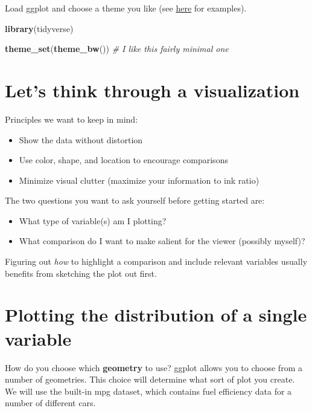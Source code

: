 \documentclass[12pt,]{book}
\newenvironment{Shaded}{\begin{snugshade}}{\end{snugshade}}
\newcommand{\CommentTok}[1]{\textcolor[rgb]{0.56,0.35,0.01}{\textit{#1}}}
\newcommand{\KeywordTok}[1]{\textcolor[rgb]{0.13,0.29,0.53}{\textbf{#1}}}
\newcommand{\NormalTok}[1]{#1}
\providecommand{\tightlist}{%
  \setlength{\itemsep}{0pt}\setlength{\parskip}{0pt}}
\begin{document}
Load ggplot and choose a theme you like (see \href{https://bookdown.org/asmundhreinn/r4ds-master/graphics-for-communication.html\#themes}{here} for examples).

\begin{Shaded}
\begin{Highlighting}[]
\KeywordTok{library}\NormalTok{(tidyverse)}

\KeywordTok{theme_set}\NormalTok{(}\KeywordTok{theme_bw}\NormalTok{()) }\CommentTok{# I like this fairly minimal one}
\end{Highlighting}
\end{Shaded}

\hypertarget{lets-think-through-a-visualization}{%
\section{Let's think through a visualization}\label{lets-think-through-a-visualization}}

Principles we want to keep in mind:

\begin{itemize}
\tightlist
\item
  Show the data without distortion
\item
  Use color, shape, and location to encourage comparisons
\item
  Minimize visual clutter (maximize your information to ink ratio)
\end{itemize}

The two questions you want to ask yourself before getting started are:

\begin{itemize}
\tightlist
\item
  What type of variable(s) am I plotting?
\item
  What comparison do I want to make salient for the viewer (possibly myself)?
\end{itemize}

Figuring out \emph{how} to highlight a comparison and include relevant variables usually benefits from sketching the plot out first.

\hypertarget{plotting-the-distribution-of-a-single-variable}{%
\section{Plotting the distribution of a single variable}\label{plotting-the-distribution-of-a-single-variable}}

How do you choose which \textbf{geometry} to use? ggplot allows you to choose from a number of geometries. This choice will determine what sort of plot you create. We will use the built-in mpg dataset, which contains fuel efficiency data for a number of different cars.
\end{document}
